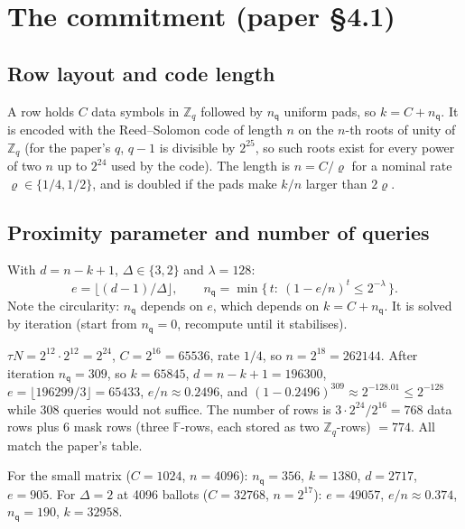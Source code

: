 \documentclass[11pt,a4paper]{article}
\newcommand{\Zq}{\mathbb{Z}_q}
\newcommand{\F}{\mathbb{F}}
\newcommand{\nq}{n_{\mathsf{q}}}
\theoremstyle{definition}
\theoremstyle{plain}
\begin{document}
\section{The commitment (paper \S4.1)}
\label{sec:commit}

\subsection{Row layout and code length}

A row holds $C$ data symbols in $\Zq$ followed by $\nq$ uniform pads, so $k=C+\nq$. It is encoded with
the Reed--Solomon code of length $n$ on the $n$-th roots of unity of $\Zq$ (for the paper's $q$,
$q-1$ is divisible by $2^{25}$, so such roots exist for every power of two $n$ up to $2^{24}$ used by the
code). The length is $n=C/\varrho$ for a nominal rate $\varrho\in\{1/4,1/2\}$, and is doubled if the pads
make $k/n$ larger than $2\varrho$.

\subsection{Proximity parameter and number of queries}

With $d=n-k+1$, $\Delta\in\{3,2\}$ and $\lambda=128$:
\[
  e=\lfloor (d-1)/\Delta\rfloor,\qquad \nq=\min\{\,t:\ (1-e/n)^t\le 2^{-\lambda}\,\}.
\]
Note the circularity: $\nq$ depends on $e$, which depends on $k=C+\nq$. It is solved by iteration
(start from $\nq=0$, recompute until it stabilises).

\begin{example}[Recomputing the paper's Table 3, big matrix, 4096 ballots, $\Delta=3$]
$\tau N=2^{12}\cdot 2^{12}=2^{24}$, $C=2^{16}=65536$, rate $1/4$, so $n=2^{18}=262144$.
After iteration $\nq=309$, so $k=65845$, $d=n-k+1=196300$, $e=\lfloor 196299/3\rfloor=65433$,
$e/n\approx 0.2496$, and $(1-0.2496)^{309}\approx 2^{-128.01}\le 2^{-128}$ while $308$ queries would not
suffice. The number of rows is $3\cdot 2^{24}/2^{16}=768$ data rows plus $6$ mask rows (three
$\F$-rows, each stored as two $\Zq$-rows) $=774$. All match the paper's table.

For the small matrix ($C=1024$, $n=4096$): $\nq=356$, $k=1380$, $d=2717$, $e=905$.
For $\Delta=2$ at 4096 ballots ($C=32768$, $n=2^{17}$): $e=49057$, $e/n\approx 0.374$, $\nq=190$, $k=32958$.
\end{example}
\end{document}
